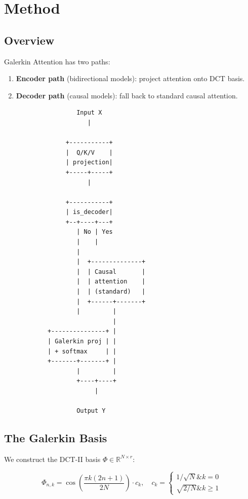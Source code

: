 
\section{Method}

\subsection{Overview}

Galerkin Attention has two paths:

\begin{enumerate}
\item \textbf{Encoder path} (bidirectional models): project attention onto DCT basis.
\item \textbf{Decoder path} (causal models): fall back to standard causal attention.

\end{enumerate}
\begin{lstlisting}
                    Input X
                       |
                        
                 +-----------+
                 |  Q/K/V    |
                 | projection|
                 +-----+-----+
                       |
                        
                 +-----------+
                 | is_decoder|
                 +--+----+---+
                    | No | Yes
                    |    |
                    |     
                    |  +--------------+
                    |  | Causal       |
                    |  | attention    |
                    |  | (standard)   |
                    |  +------+-------+
                    |         |
                              |
            +---------------+ |
            | Galerkin proj | |
            | + softmax     | |
            +-------+-------+ |
                    |         |
                    +----+----+
                         |
                          
                    Output Y
\end{lstlisting}

\subsection{The Galerkin Basis}

We construct the DCT-II basis $\Phi \in \mathbb{R}^{N \times r}$:

\[
\Phi_{n, k} = \cos\!\left(\frac{\pi k (2n + 1)}{2N}\right) \cdot
c_k, \quad c_k = \begin{cases} 1/\sqrt{N} \& k = 0 \\ \sqrt{2/N} \& k \geq 1 \end{cases}
\]

